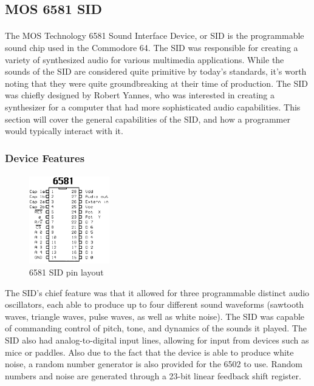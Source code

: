 \documentclass{article}
\begin{document}
\subsection{MOS 6581 SID}
\paragraph{}
The MOS Technology 6581 Sound Interface Device, or SID is the programmable sound chip used in the Commodore 64. The SID was responsible for creating a variety of synthesized audio for various multimedia applications. While the sounds of the SID are considered quite primitive by today's standards, it's worth noting that they were quite groundbreaking at their time of production. The SID was chiefly designed by Robert Yannes, who was interested in creating a synthesizer for a computer that had more sophisticated audio capabilities. This section will cover the general capabilities of the SID, and how a programmer would typically interact with it.

\subsubsection{Device Features}
\paragraph{}
\begin{figure}
\vspace{-20pt}
\begin{center}
\includegraphics[width=3.5cm]{6581}
\caption{6581 SID pin layout}
\end{center}
\end{figure}
The SID's chief feature was that it allowed for three programmable distinct audio oscillators, each able to produce up to four different sound waveforms (sawtooth waves, triangle waves, pulse waves, as well as white noise). The SID was capable of commanding control of pitch, tone, and dynamics of the sounds it played. The SID also had analog-to-digital input lines, allowing for input from devices such as mice or paddles. Also due to the fact that the device is able to produce white noise, a random number generator is also provided for the 6502 to use. Random numbers and noise are generated through a 23-bit linear feedback shift register.
\end{document}
